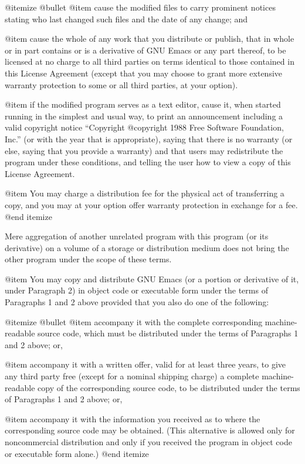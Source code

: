 @itemize @bullet
@item
cause the modified files to carry prominent notices stating
who last changed such files and the date of any change; and

@item
cause the whole of any work that you distribute or publish, that
in whole or in part contains or is a derivative of GNU Emacs or any
part thereof, to be licensed at no charge to all third parties on
terms identical to those contained in this License Agreement
(except that you may choose to grant more extensive warranty
protection to some or all third parties, at your option).

@item
if the modified program serves as a text editor, cause it, when
started running in the simplest and usual way, to print an
announcement including a valid copyright notice ``Copyright
@copyright{} 1988 Free Software Foundation, Inc.'' (or with the
year that is appropriate), saying that there is no warranty (or
else, saying that you provide a warranty) and that users may
redistribute the program under these conditions, and telling the
user how to view a copy of this License Agreement.

@item
You may charge a distribution fee for the physical act of
transferring a copy, and you may at your option offer warranty
protection in exchange for a fee.
@end itemize

Mere aggregation of another unrelated program with this program (or its
derivative) on a volume of a storage or distribution medium does not bring
the other program under the scope of these terms.

@item
You may copy and distribute GNU Emacs (or a portion or derivative of it,
under Paragraph 2) in object code or executable form under the terms
of Paragraphs 1 and 2 above provided that you also do one of the
following:

@itemize @bullet
@item
accompany it with the complete corresponding machine-readable
source code, which must be distributed under the terms of
Paragraphs 1 and 2 above; or,

@item
accompany it with a written offer, valid for at least three
years, to give any third party free (except for a nominal
shipping charge) a complete machine-readable copy of the
corresponding source code, to be distributed under the terms of
Paragraphs 1 and 2 above; or,

@item
accompany it with the information you received as to where the
corresponding source code may be obtained.  (This alternative is
allowed only for noncommercial distribution and only if you
received the program in object code or executable form alone.)
@end itemize

